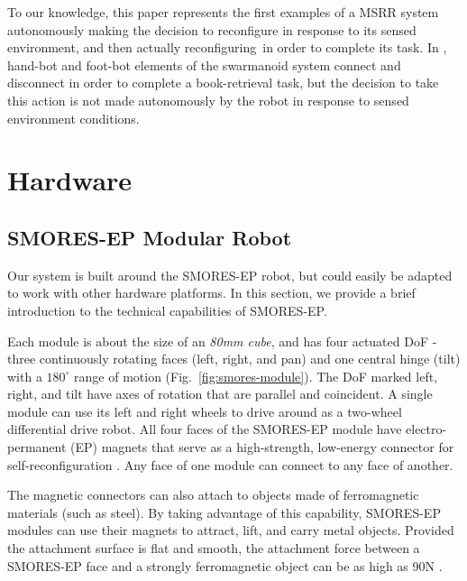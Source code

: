 \documentclass[conference]{IEEEtran}
\begin{document}
To our knowledge, this paper represents the first examples of a MSRR system autonomously making the decision to reconfigure in response to its sensed environment, and then actually reconfiguring\ in order to complete its task.  In \cite{Dorigo2013}, hand-bot and foot-bot elements of the swarmanoid system connect and disconnect in order to complete a book-retrieval task, but the decision to take this action is not made autonomously by the robot in response to sensed environment conditions. 


\section{Hardware} %
\label{sec:hardware}
%
\subsection{SMORES-EP Modular Robot} \label{sec:smores}
%
Our system is built around the SMORES-EP robot, but could easily be adapted to
work with other hardware platforms.  In this section, we provide a brief
introduction to the technical capabilities of SMORES-EP.

Each module is about the size of an \textit{80mm cube}, and has four actuated DoF - three continuously rotating faces (left, right, and
pan)  and one central hinge (tilt) with a \(180^\circ\) range of motion
(Fig.~\ref{fig:smores-module}). The DoF marked left, right, and tilt  have
 axes of rotation that are parallel and coincident. A single module can use its
left and right wheels to drive around as a two-wheel differential drive robot.
All four faces of the SMORES-EP module have electro-permanent (EP) magnets
that serve as a high-strength, low-energy connector for self-reconfiguration
\cite{tosun2016design}.  Any face of one module can connect to any face of
another.

The magnetic connectors can also attach to objects made of ferromagnetic
materials (such as steel).  By taking advantage of this capability, SMORES-EP
modules can use their magnets to attract, lift, and carry metal objects.
Provided the attachment surface is flat and smooth, the attachment force
between a SMORES-EP face and a strongly ferromagnetic object can be as high as
90N \cite{tosun2016design}.
\end{document}
